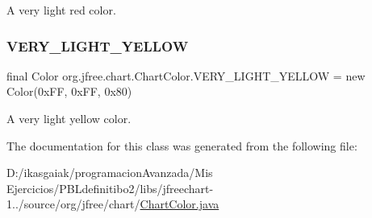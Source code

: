 A very light red color. \mbox{\label{classorg_1_1jfree_1_1chart_1_1_chart_color_a89ed157730387d79676dc7972959fc32}} 
\subsubsection{\texorpdfstring{V\+E\+R\+Y\+\_\+\+L\+I\+G\+H\+T\+\_\+\+Y\+E\+L\+L\+OW}{VERY\_LIGHT\_YELLOW}}
{\footnotesize\ttfamily final Color org.\+jfree.\+chart.\+Chart\+Color.\+V\+E\+R\+Y\+\_\+\+L\+I\+G\+H\+T\+\_\+\+Y\+E\+L\+L\+OW = new Color(0x\+F\+F, 0x\+F\+F, 0x80)\hspace{0.3cm}{\ttfamily [static]}}

A very light yellow color. 

The documentation for this class was generated from the following file\+:\begin{DoxyCompactItemize}
\item 
D\+:/ikasgaiak/programacion\+Avanzada/\+Mis Ejercicios/\+P\+B\+Ldefinitibo2/libs/jfreechart-\/1../source/org/jfree/chart/\mbox{\hyperlink{_chart_color_8java}{Chart\+Color.\+java}}\end{DoxyCompactItemize}
